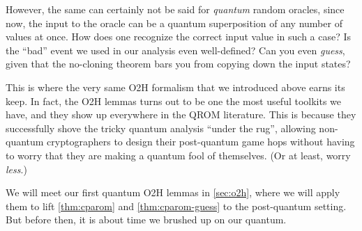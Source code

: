   However, the same can certainly not be said for \emph{quantum} random
    oracles, since now, the input to the oracle can be a quantum superposition
    of any number of values at once. How does one recognize the correct input value
    in such a case? Is the ``bad'' event we used in our analysis
    even well-defined? Can you even \emph{guess}, given that the no-cloning
    theorem bars you from copying down the input states?

  This is where the very same O2H formalism that we introduced above earns its
    keep. In fact, the O2H lemmas turns out to be one the most useful toolkits
    we have, and they show up everywhere in the QROM literature. 
    This is because they successfully shove the tricky quantum analysis
    ``under the rug'', allowing non-quantum cryptographers to design their post-quantum
    game hops without having to worry that they are making a quantum fool of
    themselves. (Or at least, worry \emph{less}.)

  We will meet our first quantum O2H
    lemmas in \cref{sec:o2h}, where we will apply them to lift
    \cref{thm:cparom} and \cref{thm:cparom-guess} to the post-quantum
    setting. But before then, it is about time we brushed up on our quantum. 

